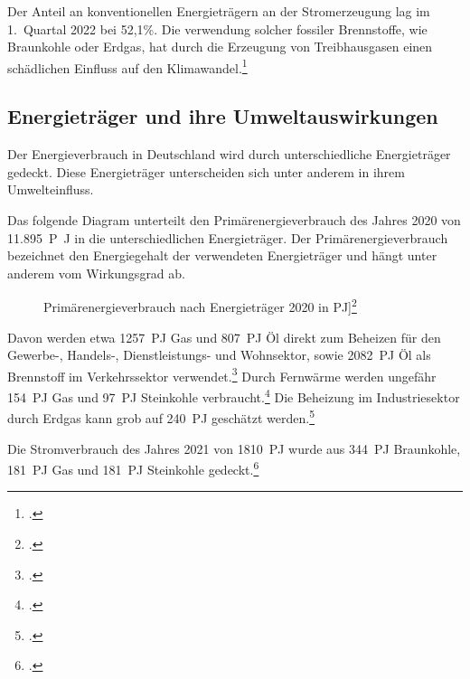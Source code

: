 \documentclass[12pt]{article}
\begin{document}
    Der Anteil an konventionellen Energieträgern an der Stromerzeugung lag im 1.\ Quartal 2022 bei 52,1\%.
    Die verwendung solcher fossiler Brennstoffe, wie Braunkohle oder Erdgas, hat durch die Erzeugung von
    Treibhausgasen einen schädlichen Einfluss auf den Klimawandel.\footcite{wilkeErneuerbareUndKonventionelle2013}

    \subsection{Energieträger und ihre Umweltauswirkungen}
    Der Energieverbrauch in Deutschland wird durch unterschiedliche Energieträger gedeckt.
    Diese Energieträger unterscheiden sich unter anderem in ihrem Umwelteinfluss.

    Das folgende Diagram unterteilt den Primärenergieverbrauch des Jahres 2020 von
    \qty{11.895}{P\joule}
    in die unterschiedlichen Energieträger.
    Der Primärenergieverbrauch bezeichnet den Energiegehalt der verwendeten Energieträger und
    hängt unter anderem vom Wirkungsgrad ab.

    \begin{figure}[!h]
        \caption{Primärenergieverbrauch nach Energieträger 2020 in
        \unit{PJ}]\footcite{Energieflussbild2020PJLang}}
    \end{figure}

    Davon werden etwa \qty{1257}{PJ} Gas und \qty{807}{PJ} Öl direkt zum Beheizen für den Gewerbe-, Handels-,
    Dienstleistungs- und Wohnsektor, sowie \qty{2082}{PJ} Öl als Brennstoff im Verkehrssektor verwendet.\footcite{Energieflussbild2020PJLang}
    Durch Fernwärme werden ungefähr \qty{154}{PJ} Gas und \qty{97}{PJ} Steinkohle verbraucht.\footcite{WieKannTransformation}
    Die Beheizung im Industriesektor durch Erdgas kann grob auf \qty{240}{PJ} geschätzt werden.\footcite{Industrie}

    Die Stromverbrauch des Jahres 2021 von \qty{1810}{PJ} wurde aus \qty{344}{PJ} Braunkohle, \qty{181}{PJ} Gas
    und \qty{181}{PJ} Steinkohle gedeckt.\footcite{SMARDEntwicklungenIm}
\end{document}
